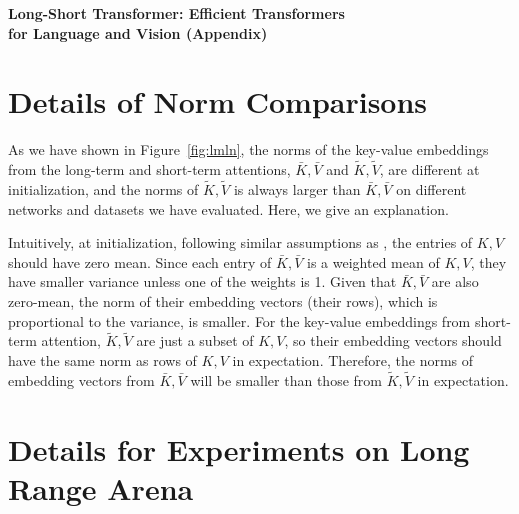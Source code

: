 

\begin{center}
    {\bf\Large Long-Short Transformer: Efficient Transformers \\ for Language and Vision (Appendix)}
\end{center}

\section{Details of Norm Comparisons}
\label{appendix:norm_analysis}
As we have shown in Figure~\ref{fig:lmln}, the norms of the key-value embeddings from the long-term and short-term attentions, $\bar{K},\bar{V}$ and $\tilde{K},\tilde{V}$, are different at initialization, and the norms of $\tilde{K},\tilde{V}$ is always larger than $\bar{K},\bar{V}$ on different networks and datasets we have evaluated. Here, we give an explanation.

Intuitively, at initialization, following similar assumptions as \citep{he2015delving,glorot2010understanding}, the entries of $K,V$ should have zero mean. Since each entry of $\bar{K},\bar{V}$ is a weighted mean of $K,V$, they have smaller variance unless one of the weights is 1. Given that $\bar{K},\bar{V}$ are also zero-mean, the norm of their embedding vectors (their rows), which is proportional to the variance, is smaller. 
For the key-value embeddings from short-term attention, $\tilde{K}, \tilde{V}$ are just a subset of $K,V$, so their embedding vectors should have the same norm as rows of $K,V$ in expectation. Therefore, the norms of embedding vectors from $\bar{K},\bar{V}$ will be smaller than those from $\tilde{K}, \tilde{V}$ in expectation.














\section{Details for Experiments on Long Range Arena}
\label{appendix:lra_configs}
